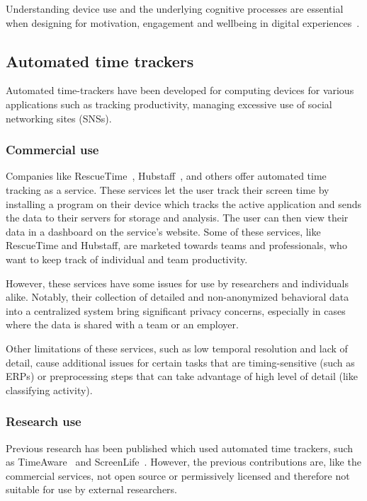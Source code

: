 \documentclass{IEEEtran}
\begin{document}
Understanding device use and the underlying cognitive processes are essential when designing for motivation, engagement and wellbeing in digital experiences~\cite{peters_designing_2018}.

\subsection{Automated time trackers}

Automated time-trackers have been developed for computing devices for various applications such as tracking productivity, managing excessive use of social networking sites (SNSs).

\subsubsection{Commercial use}

Companies like RescueTime~\cite{noauthor_rescuetime_nodate}, Hubstaff~\cite{noauthor_hubstaff_nodate}, and others offer automated time tracking as a service. These services let the user track their screen time by installing a program on their device which tracks the active application and sends the data to their servers for storage and analysis. The user can then view their data in a dashboard on the service's website. Some of these services, like RescueTime and Hubstaff, are marketed towards teams and professionals, who want to keep track of individual and team productivity.

However, these services have some issues for use by researchers and individuals alike. Notably, their collection of detailed and non-anonymized behavioral data into a centralized system bring significant privacy concerns, especially in cases where the data is shared with a team or an employer.

Other limitations of these services, such as low temporal resolution and lack of detail, cause additional issues for certain tasks that are timing-sensitive (such as ERPs) or preprocessing steps that can take advantage of high level of detail (like classifying activity).

\subsubsection{Research use}

Previous research has been published which used automated time trackers, such as TimeAware~\cite{kim_timeaware_2016} and ScreenLife~\cite{rooksby_personal_2016}. However, the previous contributions are, like the commercial services, not open source or permissively licensed and therefore not suitable for use by external researchers.
\end{document}
